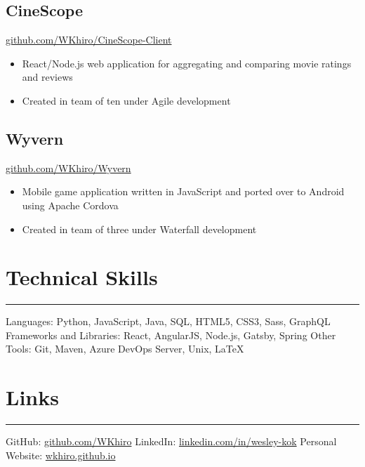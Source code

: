 \documentclass{article}
\begin{document}
\vspace{-1em}
\subsection{CineScope} \href{https://github.com/WKhiro/CineScope-Client}{\color{NavyBlue} github.com/WKhiro/CineScope-Client}
\begin{itemize}
\vspace{-0.25em}
	\itemsep0em
	\item React/Node.js web application for aggregating and comparing movie ratings and reviews
	\item Created in team of ten under Agile development
\end{itemize}

\vspace{-1em}
\subsection{Wyvern} \href{https://github.com/WKhiro/Wyvern}{\color{NavyBlue} github.com/WKhiro/Wyvern}
\begin{itemize}
\vspace{-0.25em}
	\itemsep0em
	\item Mobile game application written in JavaScript and ported over to Android using Apache Cordova
	\item Created in team of three under Waterfall development
\end{itemize}

\vspace{-1em}
\section{Technical Skills}
\vspace{-1.5em}
\par\noindent\rule{\textwidth}{0.4pt}
Languages: Python, JavaScript, Java, SQL, HTML5, CSS3, Sass, GraphQL \newline
Frameworks and Libraries: React, AngularJS, Node.js, Gatsby, Spring \newline
Other Tools: Git, Maven, Azure DevOps Server, Unix, LaTeX

\vspace{-0.5em}
\section{Links}
\vspace{-1.5em}	
\par\noindent\rule{\textwidth}{0.4pt}
{\faGithub} GitHub: {\color{NavyBlue} \href{https://github.com/WKhiro}{github.com/WKhiro}}\newline
{\color{LinkedInBlue}\faLinkedinSquare} LinkedIn: {\color{NavyBlue} \href{https://www.linkedin.com/in/wesley-kok}{linkedin.com/in/wesley-kok}}\newline
Personal Website: {\color{NavyBlue} \href{https://wkhiro.github.io}{wkhiro.github.io}}
\end{document}
